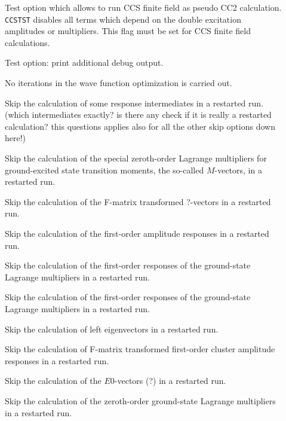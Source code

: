 \begin{description}
\item[] 
   Test option which allows to run CCS finite field as pseudo CC2
   calculation. \verb+CCSTST+ disables all terms which depend on the
   double excitation amplitudes or multipliers. This flag must be
   set for CCS finite field calculations.
%
\item[]  
   Test option: print additional debug output.
%
\item[]
   No iterations in the wave function optimization is carried out.
%
%
\item[] 
   Skip the calculation of some response intermediates
   in a restarted run.
    (which intermediates exactly?
    is there any check if it is really a restarted calculation?
    this questions applies also for all the other skip options
    down here!) 
%
\item[] 
   Skip the calculation of the special zeroth-order Lagrange 
   multipliers for ground-excited state transition moments,
   the so-called $M$-vectors, in a restarted run.
%
\item[] 
   Skip the calculation of the F-matrix transformed ?-vectors
   in a restarted run.
%
\item[] 
   Skip the calculation of the first-order amplitude responses
   in a restarted run.
%
\item[] 
   Skip the calculation of the first-order responses of the 
   ground-state Lagrange multipliers in a restarted run.
%
\item[] 
   Skip the calculation of the first-order responses of the 
   ground-state Lagrange multipliers in a restarted run.
%
\item[]  
   Skip the calculation of left eigenvectors
   in a restarted run.
%
\item[] 
   Skip the calculation of F-matrix transformed first-order
   cluster amplitude responses in a restarted run.
%
\item[] 
   Skip the calculation of the $E0$-vectors (?)
   in a restarted run.
%
\item[]  
   Skip the calculation of the zeroth-order ground-state Lagrange
   multipliers in a restarted run.

\end{description}
